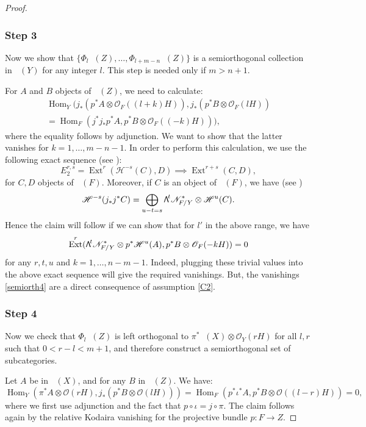 \documentclass[11pt]{article}
\newcommand\bw[1]{{\hbox{\large$\mathsf{\Lambda}$}^{\!#1}}}
\let\mathcal\mathscr
\theoremstyle{plain}
\theoremstyle{definition}
\newcommand{\cat}[1]{\mathsf{#1}}
\DeclareMathOperator{\Db}{{\cat{D}^{\mathrm{b}}}}
\DeclareMathOperator{\Hom}{Hom}
\DeclareMathOperator{\Ext}{Ext}
\newcommand{\sheaf}[1]{\mathcal{#1}}
\newcommand{\kh}{\sheaf{H}}
\newcommand{\kn}{\sheaf{N}}
\newcommand{\ko}{\sheaf{O}}\let\OO\ko\let\cO\ko
\begin{document}
\begin{proof}
\subsubsection*{Step 3}
Now we show that $\{\Phi_l \Db(Z),\ldots,\Phi_{l+m-n}\Db(Z) \}$ is a semiorthogonal collection in $\Db(Y)$
for any integer $l$. This step is needed only if $m > n+1$.

For $A$ and $B$ objects of $\Db(Z)$, we need to calculate:\vspace*{-3pt}
\begin{multline*}\label{eq:want-to-vanish1}
\Hom_Y(j_*(p^* A \otimes \ko_F((l+k)H)), j_*(p^* B \otimes \ko_F(lH))\\
=\Hom_F(j^* j_* p^* A, p^* B \otimes \ko_F((-k)H))),
\end{multline*}
where the equality follows by adjunction. We want to show that the latter vanishes
for $k=1, \ldots, m-n-1$.
In order to perform this calculation, we use the following exact
sequence (see \cite[Rem.\,3.7]{Huybook}):\vspace*{-3pt}
\[
E_2^{r,s} = \Ext^r (\kh^{-s}(C),D) \implies \Ext^{r+s}(C,D),
\]
for $C,D$ objects of $\Db(F)$.
Moreover, if $C$ is an object of $\Db(F)$, we have (see \cite[Cor.\,11.2]{Huybook})\vspace*{-3pt}
\[
\kh^{-s} (j_* j^* C) = \bigoplus_{u-t=s} \bw{t} \kn_{F/Y}^* \otimes \kh^u(C).
\]
Hence the claim will follow if we can show that for $l'$ in the above range, we have
\begin{equation}\label{semiorth4}
\Ext^r(\bw{t} \kn_{F/Y}^* \otimes p^* \kh^u (A),p^* B \otimes \ko_F(-kH))=0
\end{equation}
for any $r,t,u$ and $k=1,\ldots,n-m-1$. Indeed, plugging these trivial values into the above
exact sequence will give the required vanishings. But, the vanishings \eqref{semiorth4} are
a direct consequence of assumption \eqref{C2}.

\subsubsection*{Step 4}
Now we check that $\Phi_l \Db(Z)$ is left orthogonal to $\pi^* \Db(X) \otimes \ko_Y(rH)$ for all
$l,r$ such that $0 < r-l < m+1$, and therefore construct a semiorthogonal set of subcategories.

Let $A$ be in $\Db(X)$,
and for any $B$ in $\Db(Z)$. We have:
\begin{equation*}\label{eq:2nd-orthogonality}
\Hom_Y(\pi^* A \otimes \ko(rH),j_* (p^*B \otimes \ko(lH)))= \Hom_F(p^* \iota^* A , p^*B \otimes \ko((l-r)H))= 0,
\end{equation*}
where we first use adjunction and the fact that $p \circ \iota = j \circ \pi$.
The claim follows again by the relative Kodaira vanishing for
the projective bundle $p: F \to Z$.


\end{proof}
\end{document}
